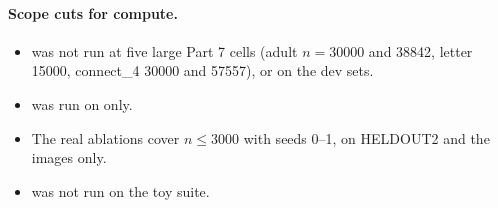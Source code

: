 \paragraph{Scope cuts for compute.}
\begin{itemize}
\item {} was not run at five large Part 7 cells (adult $n=30000$ and 38842, letter 15000, connect\_4 30000 and 57557), or on the dev sets.
\item {} was run on  only.
\item The real ablations cover $n\le3000$ with seeds 0--1, on HELDOUT2 and the images only.
\item {} was not run on the  toy suite.
\end{itemize}
\clearpage
